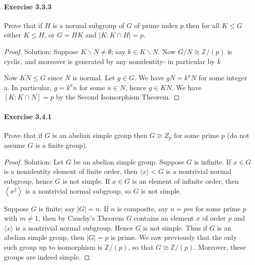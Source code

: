 \documentclass{article}
\theoremstyle{definition}
\begin{document}
\paragraph{Exercise 3.3.3} Prove that if $H$ is a normal subgroup of $G$ of prime index $p$ then for all $K \leq G$ either $K \leq H$, or $G=H K$ and $|K: K \cap H|=p$.
\begin{proof}
    Solution: Suppose $K \backslash N \neq \emptyset$; say $k \in K \backslash N$. Now $G / N \cong \mathbb{Z} /(p)$ is cyclic, and moreover is generated by any nonidentity- in particular by $\bar{k}$

Now $K N \leq G$ since $N$ is normal. Let $g \in G$. We have $g N=k^a N$ for some integer a. In particular, $g=k^a n$ for some $n \in N$, hence $g \in K N$. We have $[K: K \cap N]=p$ by the Second Isomorphism Theorem.
\end{proof}



\paragraph{Exercise 3.4.1} Prove that if $G$ is an abelian simple group then $G \cong Z_{p}$ for some prime $p$ (do not assume $G$ is a finite group).
\begin{proof}
    Solution: Let $G$ be an abelian simple group.
Suppose $G$ is infinite. If $x \in G$ is a nonidentity element of finite order, then $\langle x\rangle<G$ is a nontrivial normal subgroup, hence $G$ is not simple. If $x \in G$ is an element of infinite order, then $\left\langle x^2\right\rangle$ is a nontrivial normal subgroup, so $G$ is not simple.

Suppose $G$ is finite; say $|G|=n$. If $n$ is composite, say $n=p m$ for some prime $p$ with $m \neq 1$, then by Cauchy's Theorem $G$ contains an element $x$ of order $p$ and $\langle x\rangle$ is a nontrivial normal subgroup. Hence $G$ is not simple. Thus if $G$ is an abelian simple group, then $|G|=p$ is prime. We saw previously that the only such group up to isomorphism is $\mathbb{Z} /(p)$, so that $G \cong \mathbb{Z} /(p)$. Moreover, these groups are indeed simple.
\end{proof}
\end{document}
